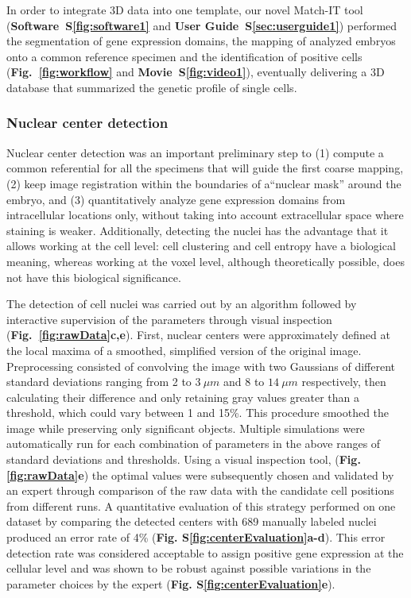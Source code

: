 In order to integrate 3D data into one template, our novel Match-IT tool (\textbf{Software~S\ref{fig:software1}} and \textbf{User Guide~S\ref{sec:userguide1}}) performed the segmentation of gene expression domains, the mapping of analyzed embryos onto a common reference specimen and the identification of positive cells (\textbf{Fig.~\ref{fig:workflow}} and \textbf{Movie~S\ref{fig:video1}}), eventually delivering a 3D database that summarized the genetic profile of single cells.



\subsubsection*{Nuclear center detection}

\label{subsec:NuclearDetection}



Nuclear center detection was an important preliminary step to (1) compute a common referential for all the specimens that will guide the first coarse mapping, (2) keep image registration within the boundaries of a``nuclear mask'' around the embryo, and (3) quantitatively analyze gene expression domains from intracellular locations only, without taking into account extracellular space where staining is weaker. Additionally, detecting the nuclei has the advantage that it allows working at the cell level: cell clustering and cell entropy have a biological meaning, whereas working at the voxel level, although theoretically possible, does not have this biological significance.



The detection of cell nuclei was carried out by an algorithm followed by interactive supervision of the parameters through visual inspection (\textbf{Fig.~\ref{fig:rawData}c,e}). First, nuclear centers were approximately defined at the local maxima of a smoothed, simplified version of the original image. Preprocessing consisted of convolving the image with two Gaussians of different standard deviations ranging from 2 to $3~\mu m$ and 8 to $14~\mu m$ respectively, then calculating their difference and only retaining gray values greater than a threshold, which could vary between 1 and 15\%. This procedure smoothed the image while preserving only significant objects. Multiple simulations were automatically run for each combination of parameters in the above ranges of standard deviations and thresholds. Using a visual inspection tool, (\textbf{Fig. \ref{fig:rawData}e}) the optimal values were subsequently chosen and validated by an expert through comparison of the raw data with the candidate cell positions from different runs. A quantitative evaluation of this strategy performed on one dataset by comparing the detected centers with 689 manually labeled nuclei produced an error rate of 4\% (\textbf{Fig. S\ref{fig:centerEvaluation}a-d}). This error detection rate was considered acceptable to assign positive gene expression at the cellular level and was shown to be robust against possible variations in the parameter choices by the expert (\textbf{Fig. S\ref{fig:centerEvaluation}e}).



